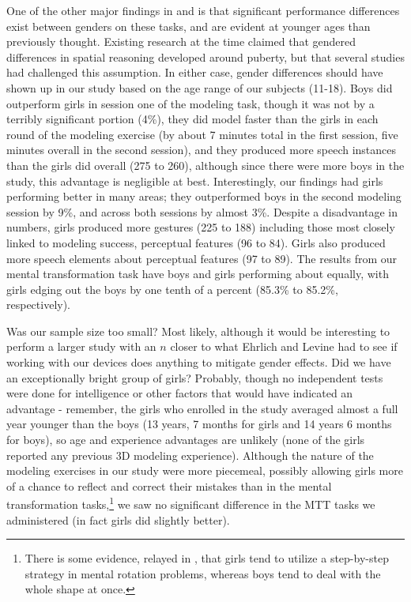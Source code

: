 One of the other major findings in \cite{ehrlich2006importance} and
\cite{levine1999early} is that significant performance differences exist between
genders on these tasks, and are evident at younger ages than previously thought.
Existing research at the time claimed that gendered differences in spatial
reasoning developed around puberty, but that several studies had challenged this
assumption. In either case, gender differences should have shown up in our study
based on the age range of our subjects (11-18). Boys did outperform girls in
session one of the modeling task,  though it was not by a terribly significant
portion (4\%), they did model faster than the girls in each round of the
modeling exercise (by about 7 minutes total in the first session, five minutes
overall in the second session), and they produced more speech instances than the
girls did overall (275 to 260), although since there were more boys in the
study, this advantage is negligible at best. Interestingly, our findings had
girls performing better in many areas; they outperformed boys in the second
modeling session by 9\%, and across both sessions by almost 3\%. Despite a
disadvantage in numbers, girls produced more gestures (225 to 188) including
those most closely linked to modeling success, perceptual features (96 to 84).
Girls also produced more speech elements about perceptual features (97 to 89).
The results from our mental transformation task have boys and girls performing
about equally, with girls edging out the boys by one tenth of a percent (85.3\%
to 85.2\%, respectively).

Was our sample size too small? Most likely, although it would be interesting to
perform a larger study with an $n$ closer to what Ehrlich and Levine had to see
if working with our devices does anything to mitigate gender effects.
Did we have an exceptionally bright group of girls? Probably, though no
independent tests were done for intelligence or other factors that would have
indicated an advantage - remember, the girls who enrolled in the study averaged
almost a full year younger than the boys (13 years, 7 months for girls and 14
years 6 months for boys), so age and experience advantages are unlikely (none of
the girls reported any previous 3D modeling experience). Although the nature of
the modeling exercises in our study were more piecemeal, possibly allowing girls
more of a chance to reflect and correct their mistakes than in the mental
transformation tasks,\footnote{There is some evidence, relayed in
\cite{ehrlich2006importance}, that girls tend to utilize a step-by-step strategy
in mental rotation problems, whereas boys tend to deal with the whole shape at
once.} we saw no significant difference in the MTT tasks we administered (in
fact girls did slightly better).

